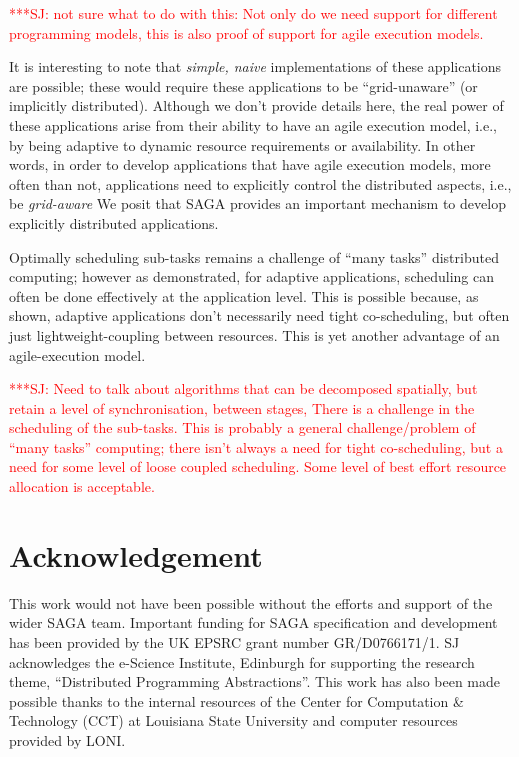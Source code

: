\documentclass[conference,final]{IEEEtran}
\newcommand{\up}{\vspace*{-1em}}
\newcommand{\upp}{\vspace*{-0.5em}}
\newcommand{\jhanote}[1]{ {\textcolor{red} { ***SJ: #1 }}}
\newcommand{\jhanote}[1]{}
\begin{document}
\jhanote{not sure what to do with this: Not only do we need support
  for different programming models, this is also proof of support for
  agile execution models.}

It is interesting to note that {\it simple, naive} implementations of
these applications are possible; these would require these
applications to be ``grid-unaware'' (or implicitly distributed).
Although we don't provide details here, the real power of these
applications arise from their ability to have an agile execution
model, i.e., by being adaptive to dynamic resource requirements or
availability. In other words, in order to develop applications that
have agile execution models, more often than not, applications need to
explicitly control the distributed aspects, i.e., be {\it grid-aware}
We posit that SAGA provides an important mechanism to develop
explicitly distributed applications.


Optimally scheduling sub-tasks remains a challenge of ``many tasks''
distributed computing; however as demonstrated, for adaptive
applications, scheduling can often be done effectively at the
application level.  This is possible because, as shown, adaptive
applications don't necessarily need tight co-scheduling, but often
just lightweight-coupling between resources. This is yet another
advantage of an agile-execution model.


\jhanote{Need to talk about algorithms that can be decomposed
  spatially, but retain a level of synchronisation, between stages,
  There is a challenge in the scheduling of the sub-tasks.  This is
  probably a general challenge/problem of ``many tasks'' computing;
  there isn't always a need for tight co-scheduling, but a need for
  some level of loose coupled scheduling.  Some level of best effort
  resource allocation is acceptable.}

\up\upp

\section*{Acknowledgement}

\up\upp

This work would not have been possible without the efforts and support
of the wider SAGA team. Important funding for SAGA specification and
development has been provided by the UK EPSRC grant number
GR/D0766171/1.  SJ acknowledges the e-Science Institute, Edinburgh for
supporting the research theme, ``Distributed Programming
Abstractions''.  This work has also been made possible thanks to the
internal resources of the Center for Computation \& Technology (CCT)
at Louisiana State University and computer resources provided by LONI.

\up\upp



\end{document}
